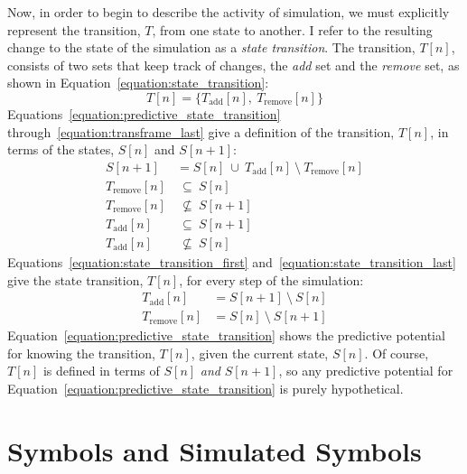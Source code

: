 Now, in order to begin to describe the activity of simulation, we must
explicitly represent the transition, $T$, from one state to another.
I refer to the resulting change to the state of the simulation as a
\emph{state transition}.  The transition, $T[n]$, consists of two sets
that keep track of changes, the \emph{add} set and the \emph{remove}
set, as shown in Equation~\ref{equation:state_transition}:
\begin{equation}
\label{equation:state_transition}
T[n] = \{T_\text{add}[n], ~T_\text{remove}[n]\}
\end{equation}
Equations~\ref{equation:predictive_state_transition}
through~\ref{equation:transframe_last} give a definition of the
transition, $T[n]$, in terms of the states, $S[n]$ and
$S[n+1]$:
\begin{align}
\label{equation:predictive_state_transition}
          S[n+1] & = S[n] ~{\cup}~ T_\text{add}[n] ~{\setminus}~ T_\text{remove}[n] \\
         T_\text{remove}[n] & ~{\subseteq}~ S[n] \\
         T_\text{remove}[n] & ~{\not\subseteq}~ S[n+1] \\
            T_\text{add}[n] & ~{\subseteq}~ S[n+1] \\
\label{equation:transframe_last}
            T_\text{add}[n] & ~{\not\subseteq}~ S[n]
\end{align}
Equations~\ref{equation:state_transition_first}
and~\ref{equation:state_transition_last} give the state transition,
$T[n]$, for every step of the simulation:
\begin{align}
  \label{equation:state_transition_first}
     T_\text{add}[n] &= S[n+1] ~{\setminus}~ S[n] \\
  \label{equation:state_transition_last}
  T_\text{remove}[n] &= S[n]   ~{\setminus}~ S[n+1]
\end{align}
Equation~\ref{equation:predictive_state_transition} shows the
predictive potential for knowing the transition, $T[n]$, given the
current state, $S[n]$.  Of course, $T[n]$ is defined in
terms of $S[n]$ \emph{and} $S[n+1]$, so any
predictive potential for
Equation~\ref{equation:predictive_state_transition} is purely
hypothetical.

\section{Symbols and Simulated Symbols}


